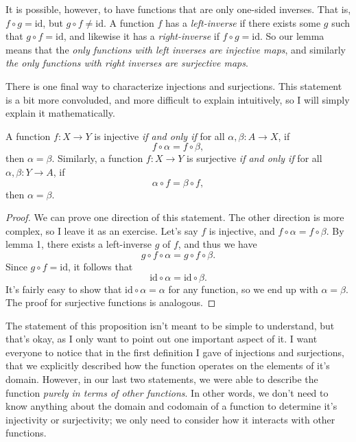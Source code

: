 \documentclass[11pt, letterpaper]{article}
\begin{document}
It is possible, however, to have functions that are only one-sided inverses. That is, $f\circ g=\mathrm{id} $, but $g\circ f\neq \mathrm{id} $. A function $f$ has a \emph{left-inverse} if there exists some $g$ such that $g\circ f=\mathrm{id} $, and likewise it has a \emph{right-inverse} if $f\circ g=\mathrm{id} $. So our lemma means that the \emph{only functions with left inverses are injective maps}, and similarly \emph{the only functions with right inverses are surjective maps}.

There is one final way to characterize injections and surjections. This statement is a bit more convoluded, and more difficult to explain intuitively, so I will simply explain it mathematically.

\begin{proposition}\label{prp:1}
	A function $f : X \to Y$ is injective \emph{if and only if} for all $\alpha ,\beta : A \to X$, if
	\[
		f\circ \alpha =f\circ \beta ,
	\]
	then $\alpha =\beta $. Similarly, a function $f: X \to Y$ is surjective \emph{if and only if} for all $\alpha ,\beta : Y \to A$, if
	\[
		\alpha \circ f=\beta \circ f
	,\]
	then $\alpha =\beta $.
\end{proposition}
\begin{proof}
	We can prove one direction of this statement. The other direction is more complex, so I leave it as an exercise. Let's say $f$ is injective, and $f\circ \alpha =f\circ \beta $. By lemma 1, there exists a left-inverse $g$ of $f$, and thus we have
	\[
		g\circ f\circ \alpha =g\circ f\circ \beta 
	.\]
	Since $g\circ f=\mathrm{id} $, it follows that
	\[
		\mathrm{id} \circ \alpha =\mathrm{id} \circ \beta 
	.\]
	It's fairly easy to show that $\mathrm{id} \circ \alpha =\alpha $ for any function, so we end up with $\alpha =\beta $. The proof for surjective functions is analogous.
\end{proof}

The statement of this proposition isn't meant to be simple to understand, but that's okay, as I only want to point out one important aspect of it. I want everyone to notice that in the first definition I gave of injections and surjections, that we explicitly described how the function operates on the elements of it's domain. However, in our last two statements, we were able to describe the function \emph{purely in terms of other functions}. In other words, we don't need to know anything about the domain and codomain of a function to determine it's injectivity or surjectivity; we only need to consider how it interacts with other functions.
\end{document}
